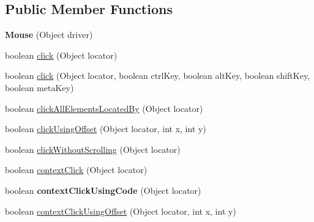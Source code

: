 \subsection*{Public Member Functions}
\begin{DoxyCompactItemize}
\item 
\hypertarget{classcom_1_1zeuslearning_1_1automation_1_1selenium_1_1interactions_1_1Mouse_a4333692e8ca4ffa47335ef5b24d13abb}{}\label{classcom_1_1zeuslearning_1_1automation_1_1selenium_1_1interactions_1_1Mouse_a4333692e8ca4ffa47335ef5b24d13abb} 
{\bfseries Mouse} (Object driver)
\item 
boolean \hyperlink{classcom_1_1zeuslearning_1_1automation_1_1selenium_1_1interactions_1_1Mouse_a60a08540de50836519b5a6e2b0dc40fe}{click} (Object locator)
\item 
boolean \hyperlink{classcom_1_1zeuslearning_1_1automation_1_1selenium_1_1interactions_1_1Mouse_ab765bba8173f469709da14c8c636fe1e}{click} (Object locator, boolean ctrl\+Key, boolean alt\+Key, boolean shift\+Key, boolean meta\+Key)
\item 
boolean \hyperlink{classcom_1_1zeuslearning_1_1automation_1_1selenium_1_1interactions_1_1Mouse_af29d27d7e5e67708d7b55c955fd873e9}{click\+All\+Elements\+Located\+By} (Object locator)
\item 
boolean \hyperlink{classcom_1_1zeuslearning_1_1automation_1_1selenium_1_1interactions_1_1Mouse_a83276a30e86403cc853d19399a9b2817}{click\+Using\+Offset} (Object locator, int x, int y)
\item 
boolean \hyperlink{classcom_1_1zeuslearning_1_1automation_1_1selenium_1_1interactions_1_1Mouse_a08be5c1a9eb96f3c8c518b9518f83769}{click\+Without\+Scrolling} (Object locator)
\item 
boolean \hyperlink{classcom_1_1zeuslearning_1_1automation_1_1selenium_1_1interactions_1_1Mouse_afdefed49a206fa9bfcc3dc3f088f8580}{context\+Click} (Object locator)
\item 
\hypertarget{classcom_1_1zeuslearning_1_1automation_1_1selenium_1_1interactions_1_1Mouse_a1229a0f27f7bd5ef931415b594cbd03c}{}\label{classcom_1_1zeuslearning_1_1automation_1_1selenium_1_1interactions_1_1Mouse_a1229a0f27f7bd5ef931415b594cbd03c} 
boolean {\bfseries context\+Click\+Using\+Code} (Object locator)
\item 
boolean \hyperlink{classcom_1_1zeuslearning_1_1automation_1_1selenium_1_1interactions_1_1Mouse_a7647f09737f1e72521682df0e4925ac6}{context\+Click\+Using\+Offset} (Object locator, int x, int y)
\item 

\end{DoxyCompactItemize}
